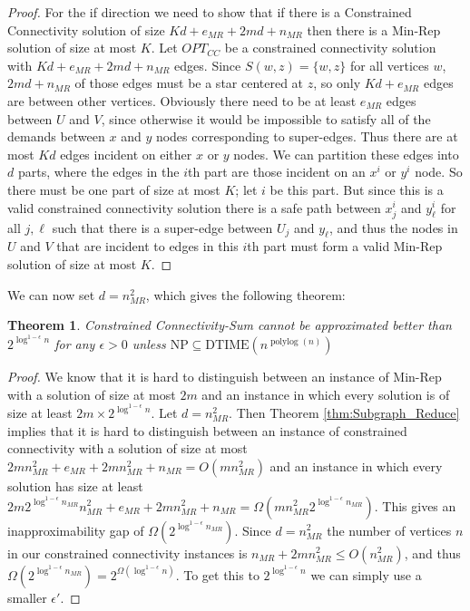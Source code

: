 \documentclass[11pt,letterpaper]{article}
\newtheorem{theorem}{Theorem}[section]
\theoremstyle{definition}
\def\polylog{\operatorname{polylog}}
\begin{document}
\begin{proof}
  For the if direction we need to show that if there is a Constrained
  Connectivity solution of size $Kd + e_{MR} + 2md + n_{MR}$ then
  there is a Min-Rep solution of size at most $K$.  Let $OPT_{CC}$ be
  a constrained connectivity solution with $Kd + e_{MR} + 2md +
  n_{MR}$ edges.  Since $S(w,z) = \{w,z\}$ for all vertices $w$, $2md
  + n_{MR}$ of those edges must be a star centered at $z$, so only $Kd
  + e_{MR}$ edges are between other vertices.  Obviously there need to
  be at least $e_{MR}$ edges between $U$ and $V$, since otherwise it
  would be impossible to satisfy all of the demands between $x$ and
  $y$ nodes corresponding to super-edges.  Thus there are at most $Kd$
  edges incident on either $x$ or $y$ nodes.  We can partition these
  edges into $d$ parts, where the edges in the $i$th part are those
  incident on an $x^i$ or $y^i$ node.  So there must be one part of
  size at most $K$; let $i$ be this part.  But since this is a valid
  constrained connectivity solution there is a safe path between
  $x_j^i$ and $y_\ell^i$ for all $j, \ell$ such that there is a
  super-edge between $U_j$ and $y_{\ell}$, and thus the nodes in $U$
  and $V$ that are incident to edges in this $i$th part must form a
  valid Min-Rep solution of size at most $K$.
\end{proof}

We can now set $d = n_{MR}^2$, which gives the following theorem:

\begin{theorem} \label{thm:ccsumhard}
  {\sc Constrained Connectivity-Sum} cannot be approximated better
  than $2^{\log^{1-\epsilon} n}$ for any $\epsilon > 0$ unless $\text{NP} \subseteq
  \text{DTIME}(n^{\polylog(n)})$
\end{theorem}
\begin{proof}
  We know that it is hard to distinguish between an instance of
  {\sc Min-Rep} with a solution of size at most $2m$ and an instance in
  which every solution is of size at least $2m \times
  2^{\log^{1-\epsilon} n}$.  Let $d = n_{MR}^2$.  Then Theorem
  \ref{thm:Subgraph_Reduce} implies that it is hard to distinguish
  between an instance of constrained connectivity with a solution of
  size at most $2mn_{MR}^2 + e_{MR} + 2mn_{MR}^2 + n_{MR} = O(m
  n_{MR}^2)$ and an instance in which every solution has size at least
  $2m2^{\log^{1-\epsilon} n_{MR}} n_{MR}^2 + e_{MR} + 2mn_{MR}^2 +
  n_{MR} = \Omega(m n_{MR}^2 2^{\log^{1-\epsilon} n_{MR}})$.  This
  gives an inapproximability gap of $\Omega(2^{\log^{1-\epsilon}
    n_{MR}})$.  Since $d = n_{MR}^2$ the number of vertices $n$ in our
  constrained connectivity instances is $n_{MR} + 2mn_{MR}^2 \leq
  O(n_{MR}^2)$, and thus $\Omega(2^{\log^{1-\epsilon} n_{MR}}) =
  2^{\Omega(\log^{1-\epsilon} n)}$.  To get this to $2^{\log^{1-\epsilon} n}$ we can simply use a smaller $\epsilon'$.
\end{proof}
\end{document}
